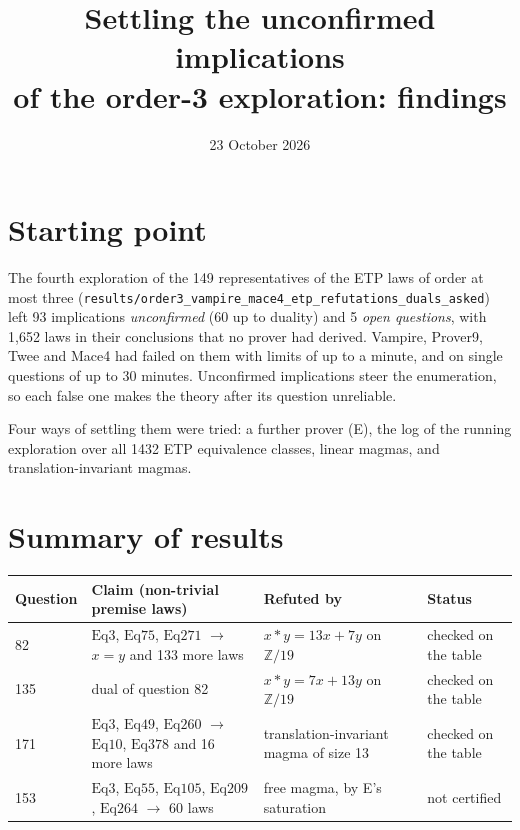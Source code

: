 \documentclass[11pt,a4paper]{article}
\title{Settling the unconfirmed implications\\of the order-3 exploration: findings}
\date{23 October 2026}
\newcommand{\code}[1]{\texttt{#1}}
\newcommand{\Eq}[1]{\mathrm{Eq}#1}
\newcommand{\Z}{\mathbb{Z}}
\begin{document}
\maketitle

\section{Starting point}

The fourth exploration of the 149 representatives of the ETP laws of order at most three
(\code{results/order3\_vampire\_mace4\_etp\_refutations\_duals\_asked}) left
93 implications \emph{unconfirmed} (60 up to duality) and 5 \emph{open questions},
with 1,652 laws in their conclusions that no prover had derived. Vampire, Prover9, Twee and
Mace4 had failed on them with limits of up to a minute, and on single questions of up to 30 minutes.
Unconfirmed implications steer the enumeration, so each false one makes the theory after its
question unreliable.

Four ways of settling them were tried: a further prover (E), the log of the running exploration
over all 1432 ETP equivalence classes, linear magmas, and translation-invariant magmas.

\section{Summary of results}

\begin{center}
\begin{tabularx}{\textwidth}{@{}l>{\raggedright}X>{\raggedright}p{4.3cm}>{\raggedright\arraybackslash}p{2.3cm}@{}}
\toprule
Question & Claim (non-trivial premise laws) & Refuted by & Status \\
\midrule
82  & $\Eq{3}$, $\Eq{75}$, $\Eq{271}$ $\to$ $x = y$ and 133 more laws & $x * y = 13x + 7y$ on $\Z/19$ & checked on the table \\
135 & dual of question 82 & $x * y = 7x + 13y$ on $\Z/19$ & checked on the table \\
171 & $\Eq{3}$, $\Eq{49}$, $\Eq{260}$ $\to$ $\Eq{10}$, $\Eq{378}$ and 16 more laws & translation-invariant magma of size 13 & checked on the table \\
153 & $\Eq{3}$, $\Eq{55}$, $\Eq{105}$, $\Eq{209}$, $\Eq{264}$ $\to$ 60 laws & free magma, by E's saturation & not certified \\
\bottomrule
\end{tabularx}
\end{center}
\end{document}
